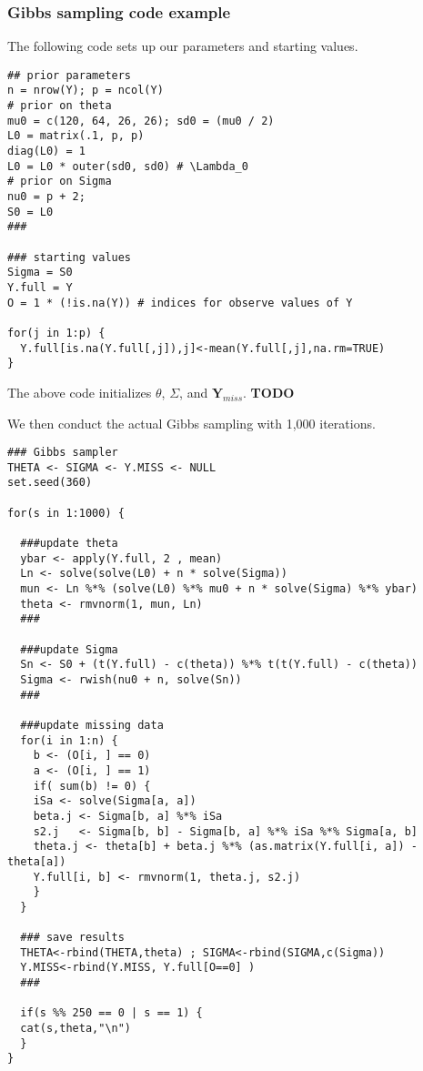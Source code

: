 \documentclass[titlepage, 12pt, leqno]{article}
\begin{document}
\subsubsection{Gibbs sampling code example}
The following code sets up our parameters and starting values.
\begin{verbatim}
## prior parameters
n = nrow(Y); p = ncol(Y)
# prior on theta
mu0 = c(120, 64, 26, 26); sd0 = (mu0 / 2)
L0 = matrix(.1, p, p)
diag(L0) = 1 
L0 = L0 * outer(sd0, sd0) # \Lambda_0
# prior on Sigma
nu0 = p + 2; 
S0 = L0
###

### starting values
Sigma = S0
Y.full = Y
O = 1 * (!is.na(Y)) # indices for observe values of Y

for(j in 1:p) {
  Y.full[is.na(Y.full[,j]),j]<-mean(Y.full[,j],na.rm=TRUE)
} 
\end{verbatim}
\begin{note}
    The above code initializes $\theta$, $\Sigma$, and $\textbf{Y}_{miss}$.
    \textbf{TODO}
\end{note}

We then conduct the actual Gibbs sampling with 1,000 iterations.
\begin{verbatim}
### Gibbs sampler
THETA <- SIGMA <- Y.MISS <- NULL
set.seed(360)

for(s in 1:1000) {

  ###update theta
  ybar <- apply(Y.full, 2 , mean)
  Ln <- solve(solve(L0) + n * solve(Sigma))
  mun <- Ln %*% (solve(L0) %*% mu0 + n * solve(Sigma) %*% ybar)
  theta <- rmvnorm(1, mun, Ln)
  ###
  
  ###update Sigma
  Sn <- S0 + (t(Y.full) - c(theta)) %*% t(t(Y.full) - c(theta))
  Sigma <- rwish(nu0 + n, solve(Sn))
  ###
  
  ###update missing data
  for(i in 1:n) { 
    b <- (O[i, ] == 0)
    a <- (O[i, ] == 1)
    if( sum(b) != 0) {
    iSa <- solve(Sigma[a, a])
    beta.j <- Sigma[b, a] %*% iSa
    s2.j   <- Sigma[b, b] - Sigma[b, a] %*% iSa %*% Sigma[a, b]
    theta.j <- theta[b] + beta.j %*% (as.matrix(Y.full[i, a]) - theta[a])
    Y.full[i, b] <- rmvnorm(1, theta.j, s2.j)
    }
  }
  
  ### save results
  THETA<-rbind(THETA,theta) ; SIGMA<-rbind(SIGMA,c(Sigma))
  Y.MISS<-rbind(Y.MISS, Y.full[O==0] )
  ###

  if(s %% 250 == 0 | s == 1) {
  cat(s,theta,"\n")
  }
}
\end{verbatim}
\end{document}
